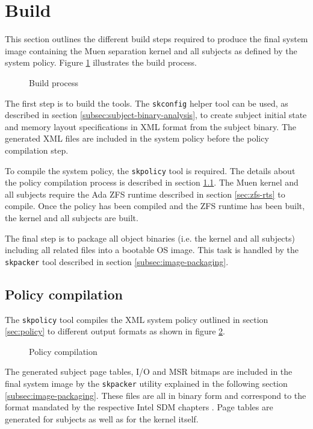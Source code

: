 \section{Build}
This section outlines the different build steps required to produce the final
system image containing the Muen separation kernel and all subjects as defined
by the system policy. Figure \ref{fig:build-process} illustrates the build
process.

\begin{figure}[h]
	\centering
	
	\caption{Build process}
	\label{fig:build-process}
\end{figure}

The first step is to build the tools. The \texttt{skconfig} helper tool can be
used, as described in section \ref{subsec:subject-binary-analysis}, to create
subject initial state and memory layout specifications in XML format from the
subject binary. The generated XML files are included in the system policy before
the policy compilation step.

To compile the system policy, the \texttt{skpolicy} tool is required. The
details about the policy compilation process is described in section
\ref{subsec:policy-compilation}.  The Muen kernel and all subjects require the
Ada ZFS runtime described in section \ref{sec:zfs-rts} to compile. Once the
policy has been compiled and the ZFS runtime has been built, the kernel and all
subjects are built.

The final step is to package all object binaries (i.e. the kernel and all
subjects) including all related files into a bootable OS image. This task is
handled by the \texttt{skpacker} tool described in section
\ref{subsec:image-packaging}.

\subsection{Policy compilation}\label{subsec:policy-compilation}
The \texttt{skpolicy} tool compiles the XML system policy outlined in section
\ref{sec:policy} to different output formats as shown in figure
\ref{fig:policy-compilation}.

\begin{figure}[h]
	\centering
	
	\caption{Policy compilation}
	\label{fig:policy-compilation}
\end{figure}

The generated subject page tables, I/O and MSR bitmaps are included in the final
system image by the \texttt{skpacker} utility explained in the following section
\ref{subsec:image-packaging}. These files are all in binary form and correspond
to the format mandated by the respective Intel SDM chapters \cite{IntelSDM}.
Page tables are generated for subjects as well as for the kernel itself.

